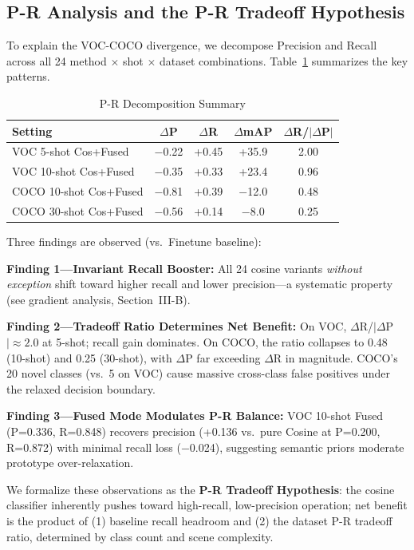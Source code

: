 \documentclass[conference]{IEEEtran}
\begin{document}
\subsection{P-R Analysis and the P-R Tradeoff Hypothesis}

To explain the VOC-COCO divergence, we decompose Precision and Recall across all 24 method $\times$ shot $\times$ dataset combinations. Table~\ref{tab:pr_summary} summarizes the key patterns.

\begin{table}[ht]
\centering\footnotesize
\caption{P-R Decomposition Summary}
\label{tab:pr_summary}
\begin{tabular}{lcccc}
\toprule
Setting & $\Delta$P & $\Delta$R & $\Delta$mAP & $\Delta$R/$|\Delta$P$|$ \\
\midrule
VOC 5-shot Cos+Fused & $-$0.22 & +0.45 & +35.9 & 2.00 \\
VOC 10-shot Cos+Fused& $-$0.35 & +0.33 & +23.4 & 0.96 \\
COCO 10-shot Cos+Fused&$-$0.81& +0.39 & $-$12.0 & 0.48 \\
COCO 30-shot Cos+Fused&$-$0.56& +0.14 & $-$8.0 & 0.25 \\
\bottomrule
\end{tabular}
\end{table}

Three findings are observed (vs.\ Finetune baseline):

\textbf{Finding 1---Invariant Recall Booster:} All 24 cosine variants \textit{without exception} shift toward higher recall and lower precision---a systematic property (see gradient analysis, Section~III-B).

\textbf{Finding 2---Tradeoff Ratio Determines Net Benefit:} On VOC, $\Delta$R/$|\Delta$P$| \approx 2.0$ at 5-shot; recall gain dominates. On COCO, the ratio collapses to 0.48 (10-shot) and 0.25 (30-shot), with $\Delta$P far exceeding $\Delta$R in magnitude. COCO's 20 novel classes (vs.\ 5 on VOC) cause massive cross-class false positives under the relaxed decision boundary.

\textbf{Finding 3---Fused Mode Modulates P-R Balance:} VOC 10-shot Fused (P=0.336, R=0.848) recovers precision (+0.136 vs.\ pure Cosine at P=0.200, R=0.872) with minimal recall loss ($-$0.024), suggesting semantic priors moderate prototype over-relaxation.

We formalize these observations as the \textbf{P-R Tradeoff Hypothesis}: the cosine classifier inherently pushes toward high-recall, low-precision operation; net benefit is the product of (1) baseline recall headroom and (2) the dataset P-R tradeoff ratio, determined by class count and scene complexity.
\end{document}
